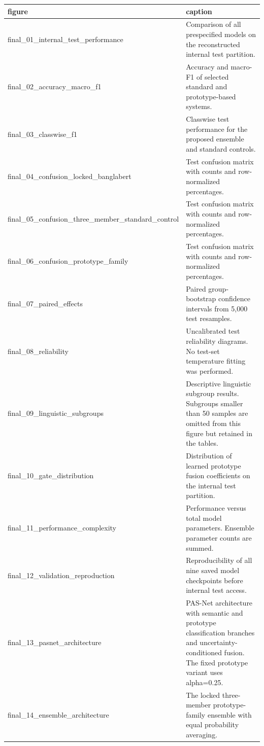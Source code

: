 \begin{tabular}{ll}
\toprule
figure & caption \\
\midrule
final\_01\_internal\_test\_performance & Comparison of all prespecified models on the reconstructed internal test partition. \\
final\_02\_accuracy\_macro\_f1 & Accuracy and macro-F1 of selected standard and prototype-based systems. \\
final\_03\_classwise\_f1 & Classwise test performance for the proposed ensemble and standard controls. \\
final\_04\_confusion\_locked\_banglabert & Test confusion matrix with counts and row-normalized percentages. \\
final\_05\_confusion\_three\_member\_standard\_control & Test confusion matrix with counts and row-normalized percentages. \\
final\_06\_confusion\_prototype\_family & Test confusion matrix with counts and row-normalized percentages. \\
final\_07\_paired\_effects & Paired group-bootstrap confidence intervals from 5,000 test resamples. \\
final\_08\_reliability & Uncalibrated test reliability diagrams. No test-set temperature fitting was performed. \\
final\_09\_linguistic\_subgroups & Descriptive linguistic subgroup results. Subgroups smaller than 50 samples are omitted from this figure but retained in the tables. \\
final\_10\_gate\_distribution & Distribution of learned prototype fusion coefficients on the internal test partition. \\
final\_11\_performance\_complexity & Performance versus total model parameters. Ensemble parameter counts are summed. \\
final\_12\_validation\_reproduction & Reproducibility of all nine saved model checkpoints before internal test access. \\
final\_13\_pasnet\_architecture & PAS-Net architecture with semantic and prototype classification branches and uncertainty-conditioned fusion. The fixed prototype variant uses alpha=0.25. \\
final\_14\_ensemble\_architecture & The locked three-member prototype-family ensemble with equal probability averaging. \\
\bottomrule
\end{tabular}
